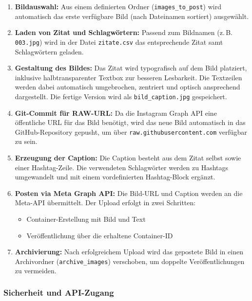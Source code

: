 \documentclass[a4paper,12pt]{article}
\begin{document}
\begin{enumerate}
    \item \textbf{Bildauswahl:} Aus einem definierten Ordner (\texttt{images\_to\_post}) wird automatisch das erste verfügbare Bild (nach Dateinamen sortiert) ausgewählt.

    \item \textbf{Laden von Zitat und Schlagwörtern:} Passend zum Bildnamen (z.\,B. \texttt{003.jpg}) wird in der Datei \texttt{zitate.csv} das entsprechende Zitat samt Schlagwörtern geladen.

    \item \textbf{Gestaltung des Bildes:} Das Zitat wird typografisch auf dem Bild platziert, inklusive halbtransparenter Textbox zur besseren Lesbarkeit. Die Textzeilen werden dabei automatisch umgebrochen, zentriert und optisch ansprechend dargestellt. Die fertige Version wird als \texttt{bild\_caption.jpg} gespeichert.

    \item \textbf{Git-Commit für RAW-URL:} Da die Instagram Graph API eine öffentliche URL für das Bild benötigt, wird das neue Bild automatisch in das GitHub-Repository gepusht, um über \texttt{raw.githubusercontent.com} verfügbar zu sein.

    \item \textbf{Erzeugung der Caption:} Die Caption besteht aus dem Zitat selbst sowie einer Hashtag-Zeile. Die verwendeten Schlagwörter werden zu Hashtags umgewandelt und mit einem vordefinierten Hashtag-Block ergänzt.

    \item \textbf{Posten via Meta Graph API:} Die Bild-URL und Caption werden an die Meta-API übermittelt. Der Upload erfolgt in zwei Schritten:
    \begin{itemize}
        \item Container-Erstellung mit Bild und Text
        \item Veröffentlichung über die erhaltene Container-ID
    \end{itemize}

    \item \textbf{Archivierung:} Nach erfolgreichem Upload wird das gepostete Bild in einen Archivordner (\texttt{archive\_images}) verschoben, um doppelte Veröffentlichungen zu vermeiden.
\end{enumerate}

\subsubsection*{Sicherheit und API-Zugang}
\end{document}
